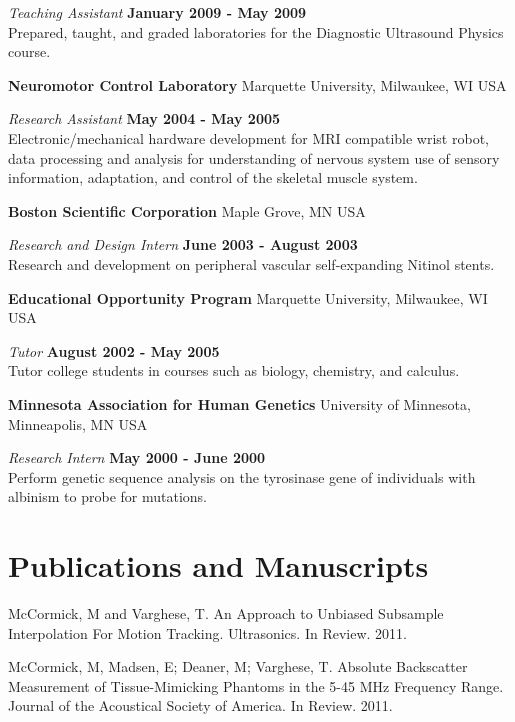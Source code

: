 \documentclass[margin,line]{res}
\begin{document}
\begin{resume}
\vspace{-.3cm}
{\em Teaching Assistant} \hfill {\bf January 2009 - May 2009} \\
Prepared, taught, and graded laboratories for the Diagnostic Ultrasound Physics
course.

{\bf Neuromotor Control Laboratory} Marquette University, Milwaukee, WI USA

\vspace{-.3cm}
{\em Research Assistant} \hfill {\bf May 2004 - May 2005} \\
Electronic/mechanical hardware development for MRI compatible wrist robot, data processing and analysis for understanding of nervous system use of sensory information,  adaptation,  and control of the skeletal muscle system.

{\bf Boston Scientific Corporation} Maple Grove, MN USA

\vspace{-.3cm}
{\em Research and Design Intern} \hfill {\bf June 2003 - August 2003} \\
Research and development on peripheral vascular self-expanding Nitinol stents.

{\bf Educational Opportunity Program} Marquette University, Milwaukee, WI USA

\vspace{-.3cm}
{\em Tutor} \hfill {\bf August 2002 - May 2005} \\
Tutor college students in courses such as biology, chemistry, and calculus.

{\bf Minnesota Association for Human Genetics} University of Minnesota, Minneapolis, MN USA

\vspace{-.3cm}
{\em Research Intern} \hfill {\bf May 2000 - June 2000} \\
Perform genetic sequence analysis on the tyrosinase gene of individuals with albinism to probe for mutations.

\section{\sc Publications and Manuscripts}

McCormick, M and Varghese, T.  An Approach to Unbiased Subsample Interpolation
For Motion Tracking.  Ultrasonics.  In Review. 2011.

McCormick, M, Madsen, E; Deaner, M; Varghese, T.  Absolute Backscatter
Measurement of Tissue-Mimicking Phantoms in the 5-45 MHz Frequency Range.  Journal of the
Acoustical Society of America.  In Review.  2011.


\end{resume}
\end{document}
